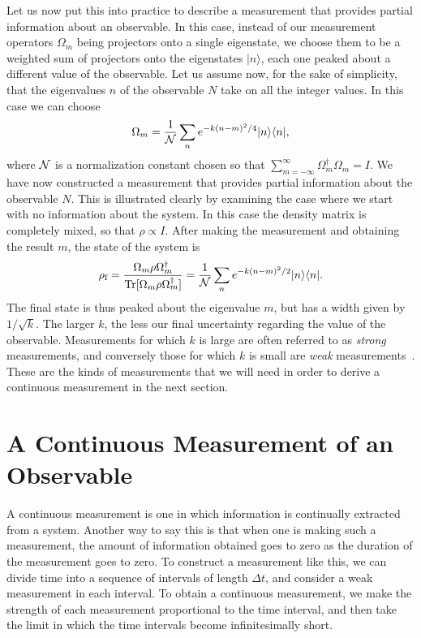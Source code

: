 \documentclass[12pt,aps,onecolum,superscriptaddress,footinbib,floatfix,showpacs]{revtex4-1}
\begin{document}
Let us now put this into practice to describe a measurement that
provides partial information about an observable. In this case,
instead of our measurement operators $\Omega_m$ being projectors
onto a single eigenstate, we choose them to be a weighted sum of
projectors onto the eigenstates $|n\rangle$, each one peaked about
a different value of the observable. Let us assume now, for the
sake of simplicity, that the eigenvalues $n$ of the observable
$N$ 
take on all the integer values. In this case we can choose
\begin{equation}
   \Omega_m = \frac{1}{\cal N} \sum_{n} e^{-k(n-m)^2/4} |n\rangle\langle
   n| ,
\end{equation}
where ${\cal N}$ is a normalization constant chosen so
that $\sum_{m=-\infty}^\infty \Omega_m^\dagger\Omega_m = I$. We have now
constructed a measurement that provides partial information about
the observable $N$. This is illustrated clearly by examining the
case where we start with no information about the system. In this case 
the density matrix is completely mixed, so that $\rho \propto I$.
After making the measurement and obtaining the result $m$, the
state of the system is
\begin{equation}
  \rho_{\mbox{\scriptsize f}} = 
   \frac{\Omega_m \rho \Omega_m^\dagger }{\mbox{Tr}[\Omega_m \rho \Omega_m^\dagger 
   ]} = \frac{1}{\cal N} \sum_{n} e^{-k(n-m)^2/2} |n\rangle\langle
   n| .
\end{equation}
The final state is thus peaked about the eigenvalue $m$, but has a
width given by $1/\sqrt{k}$. The larger $k$, the less our final
uncertainty regarding the value of the observable. Measurements
for which $k$ is large are often referred to as {\em strong}
measurements, and conversely those for which $k$ is small are {\em
weak} measurements~\cite{FJ}. These are the kinds of measurements that we
will need in order to derive a continuous measurement in the next
section.

\section{A Continuous Measurement of an Observable}
\label{section:continuousmeasurement}

A continuous measurement is one in which information is
continually extracted from a system. Another way to say this is
that when one is making such a measurement, the amount of
information obtained goes to zero as the duration of the
measurement goes to zero. To construct a measurement like this, we
can divide time into a sequence of intervals of length $\Delta t$,
and consider a weak measurement in each interval. To obtain a
continuous measurement, we make the strength of each measurement
proportional to the time interval, and then take the limit in
which the time intervals become infinitesimally short.
\end{document}
